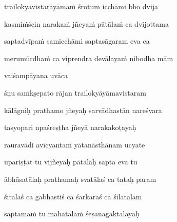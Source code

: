 trailokyavistarāyāma\.m śrotum icchāmi bho dvija\thinspace{\dandab} \dontdisplaylinenum

kasmi\.mścin naraka\.m jñeya\.m pātāla\.m ca dvijottama \veg\dontdisplaylinenum

saptadvīpa\.m samicchāmi saptasāgaram eva ca\thinspace{\dandab} \dontdisplaylinenum

merumūrdha\.m ca viprendra devālaya\.m nibodha mām \veg\dontdisplaylinenum


vaiśampāyana uvāca~{\dandab}\dontdisplaylinenum 

śṇu sa\.mkṣepato rājan trailokyāyāmavistaram\thinspace{\danda} \dontdisplaylinenum

kālāgniḥ prathamo jñeyaḥ sarvādhastān nareśvara \veg\dontdisplaylinenum

tasyopari npaśreṣṭha jñeyā narakakoṭayaḥ\thinspace{\dandab} \dontdisplaylinenum

rauravādi avīcyanta\.m yātanāsthānam ucyate \veg\dontdisplaylinenum


upariṣṭāt tu vijñeyāḥ pātālāḥ sapta eva tu\thinspace{\dandab} \dontdisplaylinenum

ābhāsatālaḥ prathamaḥ svatālaś ca tataḥ param \veg\dontdisplaylinenum

śītalaś ca gabhastiś ca śarkaraś ca śilātalam\thinspace{\dandab} \dontdisplaylinenum

saptama\.m tu mahātāla\.m śeṣanāgaktālayaḥ \veg\dontdisplaylinenum

